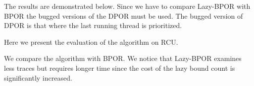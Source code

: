 The results are demonstrated below. Since we have to compare Lazy-BPOR with BPOR the bugged versions of the DPOR must be used. The bugged version
of DPOR is that where the last running thread is prioritized.

Here we present the evaluation of the algorithm on RCU.




We compare the algorithm with BPOR. We notice that Lazy-BPOR examines less traces but requires longer time since the cost of the lazy bound count is significantly
increased.


